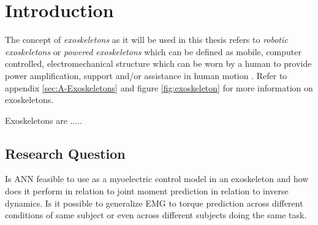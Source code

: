 \documentclass[../main.tex]{subfiles}
\begin{document}
\chapter{Introduction}
The concept of \textit{exoskeletons} as it will be used in this thesis refers to \textit{robotic exoskeletons} or \textit{powered exoskeletons} which can be defined as mobile, computer controlled, electromechanical structure which can be worn by a human to provide power amplification, support and/or assistance in human motion \cite{Anam2012, Gorgey2018}. 
Refer to appendix \ref{sec:A-Exoskeletons} and figure \ref{fig:exoskeleton} for more information on exoskeletons.

Exoskeletons are .....







\section{Research Question}
Is ANN feasible to use as a myoelectric control model in an exoskeleton and how does it perform in relation to joint moment prediction in relation to inverse dynamics. 
Is it possible to generalize EMG to torque prediction across different conditions of same subject or even across different subjects doing the same task.
\end{document}
